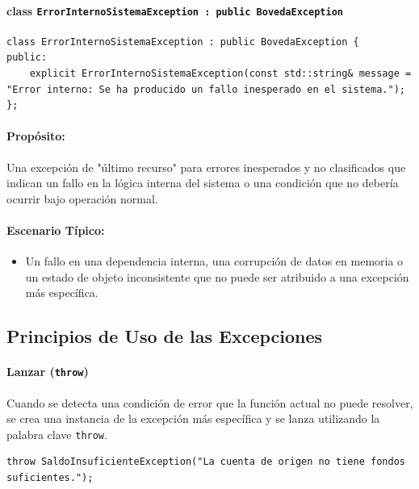 \documentclass{article}
\newcommand{\inlinecode}[1]{\texttt{#1}}
\begin{document}
\paragraph*{\textbf{class \inlinecode{ErrorInternoSistemaException : public BovedaException}}}
\begin{lstlisting}
class ErrorInternoSistemaException : public BovedaException {
public:
    explicit ErrorInternoSistemaException(const std::string& message = "Error interno: Se ha producido un fallo inesperado en el sistema.");
};
\end{lstlisting}
\paragraph*{Propósito:} Una excepción de "último recurso" para errores inesperados y no clasificados que indican un fallo en la lógica interna del sistema o una condición que no debería ocurrir bajo operación normal.

\paragraph*{Escenario Típico:}
\begin{itemize}
    \item Un fallo en una dependencia interna, una corrupción de datos en memoria o un estado de objeto inconsistente que no puede ser atribuido a una excepción más específica.
\end{itemize}

\subsection*{Principios de Uso de las Excepciones}

\paragraph*{\textbf{Lanzar (\inlinecode{throw})}}
Cuando se detecta una condición de error que la función actual no puede resolver, se crea una instancia de la excepción más específica y se lanza utilizando la palabra clave \inlinecode{throw}.
\begin{lstlisting}
throw SaldoInsuficienteException("La cuenta de origen no tiene fondos suficientes.");
\end{lstlisting}
\end{document}
